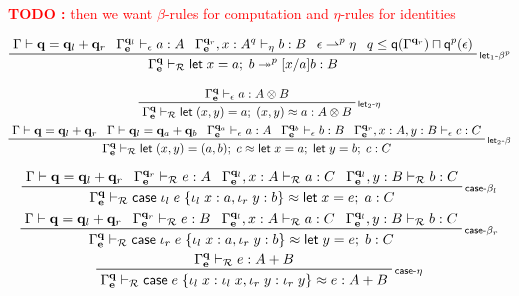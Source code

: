 \documentclass[acmsmall,screen,review]{acmart}
\newcounter{todos}
\newcommand{\TODO}[1]{{
  \stepcounter{todos}
  \begin{center}\large{\textcolor{red}{\textbf{TODO \arabic{todos}:} #1}}\end{center}
}}
\newcommand{\mc}[1]{\ensuremath{\mathcal{#1}}}
\newcommand{\mb}[1]{\ensuremath{\mathbf{#1}}}
\newcommand{\ms}[1]{\ensuremath{\mathsf{#1}}}
\newcommand{\lto}{:}
\newcommand{\linl}[1]{\iota_l\;{#1}}
\newcommand{\linr}[1]{\iota_r\;{#1}}
\newcommand{\letexpr}[3]{\ensuremath{\ms{let}\;#1 = #2;\;#3}}
\newcommand{\caseexpr}[5]{\ms{case}\;#1\;\{\linl{#2} \lto #3, \linr{#4} \lto #5\}}
\newcommand{\qsp}[4]{#1 \vdash #2 = #3 + #4}
\newcommand{\rle}[1]{{\scriptsize\textsf{#1}}}
\newcommand{\hasty}[4]{#1 \vdash_{#2} #3: {#4}}
\newcommand{\teqv}{\approx}
\newcommand{\tref}{\twoheadrightarrow}
\newcommand{\tmlep}[6]{#1 \vdash_{#2} #3 \tref^{#6} #4 : {#5}}
\newcommand{\tmeq}[5]{#1 \vdash_{#2} #3 \teqv #4 : {#5}}
\newcommand{\rightmove}{\rightharpoonup}
\newcommand{\alquant}{\ms{q}}
\begin{document}
\TODO{then we want $\beta$-rules for computation and $\eta$-rules for identities}

\begin{gather*}
  \prftree[r]{\rle{let$_1$-$\beta^p$}}
    {\qsp{\Gamma}{\mb{q}}{\mb{q}_l}{\mb{q}_r}}
    {\hasty{\Gamma^{\mb{q}_l}_{\mb{e}}}{\epsilon}{a}{A}}
    {\hasty{\Gamma^{\mb{q}_r}_{\mb{e}}, x : A^q}{\eta}{b}{B}}
    {\epsilon \rightmove^p \eta}
    {q \leq \alquant(\Gamma^{\mb{q}_r}) \sqcap \alquant^p(\epsilon)}
    {
      \tmlep{\Gamma^{\mb{q}}_{\mb{e}}}{\mc{R}}{\letexpr{x}{a}{b}}{[x/a]b}{B}{p}
    }
\end{gather*}

\begin{gather*}
  \prftree[r]{\rle{let$_2$-$\eta$}}
    {\hasty{\Gamma^{\mb{q}}_{\mb{e}}}{\epsilon}{a}{A \otimes B}}
    {
      \tmeq{\Gamma^{\mb{q}}_{\mb{e}}}{\mc{R}}{\letexpr{(x, y)}{a}{(x, y)}}{a}{A \otimes B}
    }
  \\
  \prftree[r]{\rle{let$_2$-$\beta$}}
    {\qsp{\Gamma}{\mb{q}}{\mb{q}_l}{\mb{q}_r}}
    {\qsp{\Gamma}{\mb{q}_l}{\mb{q}_a}{\mb{q}_b}}
    {\hasty{\Gamma^{\mb{q}_a}_{\mb{e}}}{\epsilon}{a}{A}}
    {\hasty{\Gamma^{\mb{q}_b}_{\mb{e}}}{\epsilon}{b}{B}}
    {\hasty{\Gamma^{\mb{q}_r}_{\mb{e}}, x : A, y : B}{\epsilon}{c}{C}}
    {
      \tmeq{\Gamma^{\mb{q}}_{\mb{e}}}{\mc{R}}
        {\letexpr{(x, y)}{(a, b)}{c}}
        {\letexpr{x}{a}{\letexpr{y}{b}{c}}}{C}
    }
\end{gather*}

\begin{gather*}
  \prftree[r]{\rle{case-$\beta_l$}}
    {\qsp{\Gamma}{\mb{q}}{\mb{q}_l}{\mb{q}_r}}
    {\hasty{\Gamma^{\mb{q}_r}_{\mb{e}}}{\mc{R}}{e}{A}}
    {\hasty{\Gamma^{\mb{q}_l}_{\mb{e}}, x : A}{\mc{R}}{a}{C}}
    {\hasty{\Gamma^{\mb{q}_l}_{\mb{e}}, y : B}{\mc{R}}{b}{C}}
    {\tmeq{\Gamma^{\mb{q}}_{\mb{e}}}{\mc{R}}
      {\caseexpr{\linl{e}}{x}{a}{y}{b}}
      {\letexpr{x}{e}{a}}
      {C}
    } \\
  \prftree[r]{\rle{case-$\beta_r$}}
    {\qsp{\Gamma}{\mb{q}}{\mb{q}_l}{\mb{q}_r}}
    {\hasty{\Gamma^{\mb{q}_r}_{\mb{e}}}{\mc{R}}{e}{B}}
    {\hasty{\Gamma^{\mb{q}_l}_{\mb{e}}, x : A}{\mc{R}}{a}{C}}
    {\hasty{\Gamma^{\mb{q}_l}_{\mb{e}}, y : B}{\mc{R}}{b}{C}}
    {\tmeq{\Gamma^{\mb{q}}_{\mb{e}}}{\mc{R}}
      {\caseexpr{\linr{e}}{x}{a}{y}{b}}
      {\letexpr{y}{e}{b}}
      {C}
    } \\
  \prftree[r]{\rle{case-$\eta$}}
    {\hasty{\Gamma^{\mb{q}}_{\mb{e}}}{\mc{R}}{e}{A + B}}
    {\tmeq{\Gamma^{\mb{q}}_{\mb{e}}}{\mc{R}}
      {\caseexpr{e}{x}{\linl{x}}{y}{\linr{y}}}
      {e}
      {A + B}
    }
\end{gather*}
\end{document}
